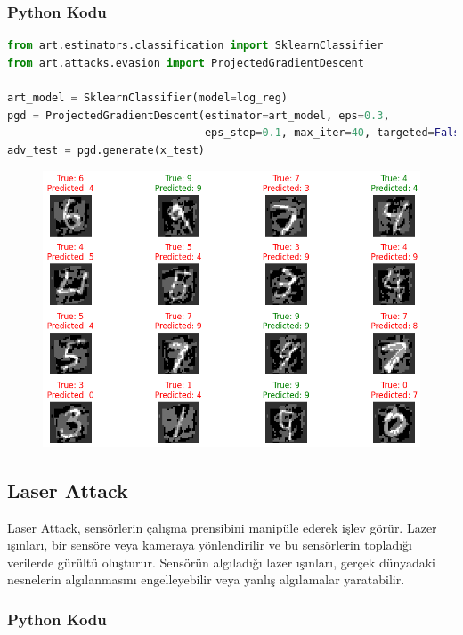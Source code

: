 \subsubsection{Python Kodu}

\begin{lstlisting}[language=Python]
from art.estimators.classification import SklearnClassifier
from art.attacks.evasion import ProjectedGradientDescent

art_model = SklearnClassifier(model=log_reg)
pgd = ProjectedGradientDescent(estimator=art_model, eps=0.3, 
                               eps_step=0.1, max_iter=40, targeted=False)
adv_test = pgd.generate(x_test)
\end{lstlisting}

\begin{figure}[h]
    \centering
    \includegraphics[width=1\textwidth]{images/pgd_attack_results.png}
    \caption{}
\end{figure}

\newpage

\subsection{Laser Attack}

Laser Attack, sensörlerin çalışma prensibini manipüle ederek işlev görür. Lazer ışınları, bir sensöre veya kameraya yönlendirilir ve bu sensörlerin topladığı verilerde gürültü oluşturur. Sensörün algıladığı lazer ışınları, gerçek dünyadaki nesnelerin algılanmasını engelleyebilir veya yanlış algılamalar yaratabilir.

\subsubsection{Python Kodu}

